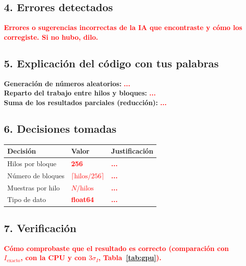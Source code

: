 \documentclass[11pt,a4paper]{article}
\newcommand{\pend}[1]{\textcolor{red}{\textbf{#1}}}
\begin{document}
\subsection*{4. Errores detectados}
\pend{Errores o sugerencias incorrectas de la IA que encontraste y cómo los corregiste. Si no hubo, dilo.}

\subsection*{5. Explicación del código con tus palabras}
\textbf{Generación de números aleatorios:} \pend{...}\\
\textbf{Reparto del trabajo entre hilos y bloques:} \pend{...}\\
\textbf{Suma de los resultados parciales (reducción):} \pend{...}

\subsection*{6. Decisiones tomadas}
\begin{center}\small
\begin{tabular}{p{4cm}p{3cm}p{7.5cm}}
\toprule
Decisión & Valor & Justificación\\
\midrule
Hilos por bloque & \pend{256} & \pend{...}\\
Número de bloques & \pend{$\lceil \text{hilos}/256\rceil$} & \pend{...}\\
Muestras por hilo & \pend{$N/\text{hilos}$} & \pend{...}\\
Tipo de dato & \pend{float64} & \pend{...}\\
\bottomrule
\end{tabular}
\end{center}

\subsection*{7. Verificación}
\pend{Cómo comprobaste que el resultado es correcto (comparación con $I_{\text{exacto}}$, con la CPU y con $3\sigma_I$, Tabla~\ref{tab:gpu}).}
\end{document}
